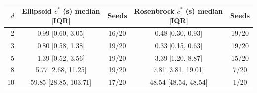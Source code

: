 \begin{tabular}{rcccc}
\toprule
$d$ & Ellipsoid $c^*$ (s) median [IQR] & Seeds & Rosenbrock $c^*$ (s) median [IQR] & Seeds \\
\midrule
2 & 0.99 [0.60, 3.05] & 16/20 & 0.48 [0.30, 0.93] & 19/20 \\
3 & 0.80 [0.58, 1.38] & 19/20 & 0.33 [0.15, 0.63] & 19/20 \\
5 & 1.39 [0.52, 3.56] & 19/20 & 3.39 [1.20, 8.87] & 15/20 \\
8 & 5.77 [2.68, 11.25] & 19/20 & 7.81 [3.81, 19.01] & 7/20 \\
10 & 59.85 [28.85, 103.71] & 17/20 & 48.54 [48.54, 48.54] & 1/20 \\
\bottomrule
\end{tabular}
